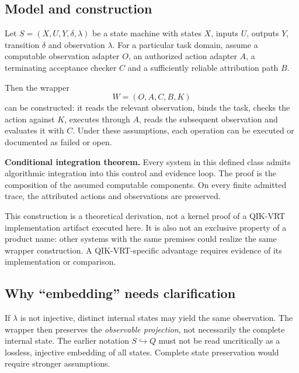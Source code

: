 \begin{cols}
\subsection*{Model and construction}
Let $S=(X,U,Y,\delta,\lambda)$ be a state machine with states $X$, inputs $U$, outputs $Y$, transition $\delta$ and observation $\lambda$. For a particular task domain, assume a computable observation adapter $O$, an authorized action adapter $A$, a terminating acceptance checker $C$ and a sufficiently reliable attribution path $B$.

Then the wrapper
\[
 W=(O,A,C,B,K)
\]
can be constructed: it reads the relevant observation, binds the task, checks the action against $K$, executes through $A$, reads the subsequent observation and evaluates it with $C$. Under these assumptions, each operation can be executed or documented as failed or open.

\textbf{Conditional integration theorem.} Every system in this defined class admits algorithmic integration into this control and evidence loop. The proof is the composition of the assumed computable components. On every finite admitted trace, the attributed actions and observations are preserved.

This construction is a theoretical derivation, not a kernel proof of a QIK-VRT implementation artifact executed here. It is also not an exclusive property of a product name: other systems with the same premises could realize the same wrapper construction. A QIK-VRT-specific advantage requires evidence of its implementation or comparison.

\subsection*{Why ``embedding'' needs clarification}
If $\lambda$ is not injective, distinct internal states may yield the same observation. The wrapper then preserves the \emph{observable projection}, not necessarily the complete internal state. The earlier notation $S\hookrightarrow Q$ must not be read uncritically as a lossless, injective embedding of all states. Complete state preservation would require stronger assumptions.


\end{cols}
